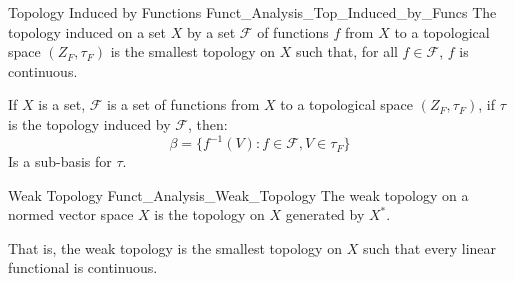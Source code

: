             \begin{ldefinition}{Topology Induced by Functions}
                  {Funct_Analysis_Top_Induced_by_Funcs}
                The topology induced on a set $X$ by a
                set $\mathcal{F}$ of functions $f$ from $X$ to
                a topological space $(Z_{F},\tau_{F})$ is the
                smallest topology on $X$ such that, for all
                $f\in\mathcal{F}$, $f$ is continuous.
            \end{ldefinition}
            \begin{theorem}
                If $X$ is a set, $\mathcal{F}$ is a set of functions
                from $X$ to a topological space $(Z_{F},\tau_{F})$,
                if $\tau$ is the topology induced by $\mathcal{F}$,
                then:
                \begin{equation}
                    \beta=\big\{f^{\minus{1}}(V):
                        f\in\mathcal{F},V\in\tau_{F}\big\}
                \end{equation}
                Is a sub-basis for $\tau$.
            \end{theorem}
            \begin{ldefinition}{Weak Topology}
                  {Funct_Analysis_Weak_Topology}
                The weak topology on a normed vector space
                $X$ is the topology on $X$ generated by 
                $X^{*}$.
            \end{ldefinition}
            That is, the weak topology is the smallest topology on
            $X$ such that every linear functional is continuous.

